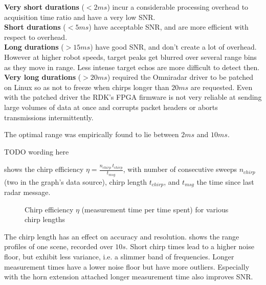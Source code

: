 \textbf{Very short durations} (\(<2ms\)) incur a considerable processing
overhead to acquisition time ratio and have a very low SNR.\\
\textbf{Short durations} (\(<5ms\)) have acceptable SNR, and are more
efficient with respect to overhead.\\
\textbf{Long durations} (\(>15ms\))
have good SNR, and don't create a lot of overhead. However at higher
robot speeds, target peaks get blurred over several range bins as they
move in range. Less intense target echos are more difficult to detect
then.\\
\textbf{Very long durations} (\(>20ms\)) required the Omniradar
driver to be patched on Linux so as not to freeze when chirps longer
than \(20ms\) are requested. Even with the patched driver the RDK's FPGA
firmware is not very reliable at sending large volumes of data at once
and corrupts packet headers or aborts transmissions intermittently.

The optimal range was empirically found to lie between \(2ms\) and
\(10ms\).

TODO wording here

 shows the chirp efficiency
\(\eta = \frac{n_{chirp}~t_{chirp}}{t_{msg}}\), with number of
consecutive sweeps \(n_{chirp}\) (two in the graph's data source), chirp
length \(t_{chirp}\), and \(t_{msg}\) the time since last radar message.

\begin{figure}[htbp]
    \centering
    \def\svgwidth{10cm}
    
    \caption{Chirp efficiency \(\eta\) (measurement time per time spent) for various chirp lengths}
    \label{fig:fig_chirp_eff}
\end{figure}

The chirp length has an effect on accuracy and resolution.  shows the range profiles of one scene, recorded over $10s$. Short chirp times lead to a higher noise floor, but exhibit less variance, i.e. a slimmer band of frequencies. Longer measurement times have a lower noise floor but have more outliers. Especially with the horn extension attached longer measurement time also improves SNR.

